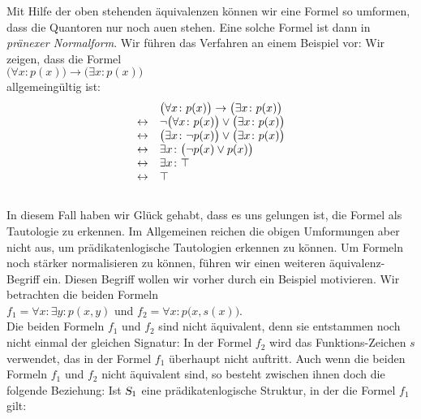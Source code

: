 Mit Hilfe der oben stehenden \"{a}quivalenzen k\"{o}nnen wir eine Formel so umformen, dass die Quantoren nur
noch au\3en stehen.  Eine solche Formel ist dann in \emph{pr\"{a}nexer Normalform}.  Wir f\"{u}hren
das Verfahren an einem Beispiel vor: Wir zeigen, dass die Formel \\[0.2cm]
\hspace*{1.3cm} $\big(\forall x\colon p(x)\big) \rightarrow \big(\exists x\colon p(x)\big)$ \\[0.2cm]
allgemeing\"{u}ltig ist: 
$$ 
\begin{array}{ll}
                 & \big(\forall x\colon p(x)\big) \rightarrow \big(\exists x\colon p(x)\big)  \\
 \leftrightarrow & \neg \big(\forall x\colon p(x)\big) \vee \big(\exists x\colon p(x)\big)    \\
 \leftrightarrow & \big(\exists x\colon \neg p(x)\big) \vee \big(\exists x\colon p(x)\big)    \\
 \leftrightarrow & \exists x\colon \bigl(\neg p(x) \vee p(x)\bigr) \\
 \leftrightarrow & \exists x\colon \top                                                  \\
 \leftrightarrow & \top                                                  \\
\end{array}
$$
\\[0.2cm]
In diesem Fall haben wir Gl\"{u}ck gehabt, dass es uns gelungen ist, die Formel als Tautologie zu
erkennen.  Im Allgemeinen reichen die obigen Umformungen aber nicht aus, um pr\"{a}dikatenlogische
Tautologien erkennen zu k\"{o}nnen.
Um Formeln noch st\"{a}rker normalisieren zu k\"{o}nnen, 
f\"{u}hren wir einen weiteren
\"{a}quivalenz-Begriff ein.  Diesen Begriff wollen wir vorher durch ein Beispiel motivieren.
Wir betrachten die beiden Formeln \\[0.2cm]
\hspace*{1.3cm} $f_1 = \forall x \colon \exists y \colon p(x,y)$ \quad und \quad $f_2 = \forall x \colon p\bigl(x,s(x)\bigr)$.\\[0.2cm]
Die beiden Formeln $f_1$ und $f_2$ sind nicht \"{a}quivalent, denn sie entstammen noch nicht
einmal der gleichen Signatur: In der Formel $f_2$ wird das Funktions-Zeichen $s$
verwendet, das in der Formel $f_1$ \"{u}berhaupt nicht auftritt. 
Auch wenn die beiden Formeln $f_1$ und $f_2$ nicht \"{a}quivalent sind, so besteht zwischen
ihnen doch die folgende Beziehung:  Ist $\textsl{S}_1$ eine
pr\"{a}dikatenlogische Struktur, in der die Formel $f_1$ gilt:
